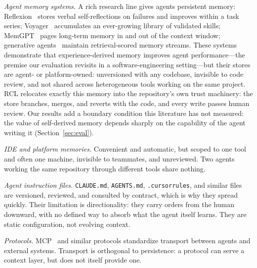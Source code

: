 \documentclass[sigconf,screen]{acmart}
\begin{document}
\emph{Agent memory systems.} A rich research line gives agents persistent memory:
Reflexion~\cite{shinn2023reflexion} stores verbal self-reflections on failures and
improves within a task series; Voyager~\cite{wang2023voyager} accumulates an
ever-growing library of validated skills; MemGPT~\cite{packer2023memgpt} pages
long-term memory in and out of the context window; generative
agents~\cite{park2023generative} maintain retrieval-scored memory streams. These
systems demonstrate that experience-derived memory improves agent
performance---the premise our evaluation revisits in a software-engineering
setting---but their stores are agent- or platform-owned: unversioned with any
codebase, invisible to code review, and not shared across heterogeneous tools
working on the same project. RCL relocates exactly this memory into the
repository's own trust machinery: the store branches, merges, and reverts with the
code, and every write passes human review. Our results add a boundary condition
this literature has not measured: the value of self-derived memory depends sharply
on the capability of the agent writing it (Section~\ref{sec:eval}).

\emph{IDE and platform memories.} Convenient and automatic, but scoped to one tool
and often one machine, invisible to teammates, and unreviewed. Two agents working
the same repository through different tools share nothing.

\emph{Agent instruction files.} \texttt{CLAUDE.md}, \texttt{AGENTS.md},
\texttt{.cursorrules}, and similar files are versioned, reviewed, and consulted by
contract, which is why they spread quickly. Their limitation is directionality:
they carry orders from the human downward, with no defined way to absorb what the
agent itself learns. They are static configuration, not evolving context.

\emph{Protocols.} MCP~\cite{mcp2024} and similar protocols standardize transport
between agents and external systems. Transport is orthogonal to persistence: a
protocol can serve a context layer, but does not itself provide one.
\end{document}
